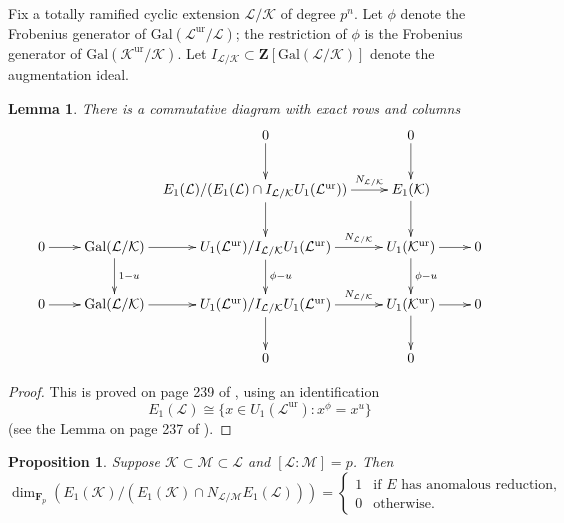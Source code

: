 \documentclass[reqno]{amsart}
\newtheorem{lem}[thm]{Lemma}
\newtheorem{prop}[thm]{Proposition}
\theoremstyle{definition}
\def\Z{\mathbf{Z}}
\def\F{\mathbf{F}}
\def\Fp{\F_p}
\def\K{\mathcal{K}}
\def\L{\mathcal{L}}
\def\M{\mathcal{M}}
\def\Gal{\mathrm{Gal}}
\def\unr{\mathrm{ur}}
\begin{document}
Fix a totally ramified cyclic extension $\L/\K$ of degree $p^n$.  
Let $\phi$ denote the Frobenius generator of $\Gal(\L^\unr/\L)$; the 
restriction of $\phi$ is the Frobenius generator of 
$\Gal(\K^\unr/\K)$.  
Let $I_{\L/\K} \subset \Z[\Gal(\L/\K)]$ denote the augmentation ideal.

\begin{lem}
\label{bigd}
There is a commutative diagram with exact rows and columns
$$
\xymatrix@C=22pt{
&& 0 \ar[d] & 0 \ar[d] \\
&& \hskip -15pt E_1(\L)/(E_1(\L) \cap I_{\L/\K} U_1(\L^\unr)) \ar^-{N_{\L/\K}}[r]\ar[d] & E_1(\K) \ar[d] \\
0 \ar[r] & \Gal(\L/\K) \ar[r] \ar^{1-u}[d] & U_1(\L^\unr)/I_{\L/\K} U_1(\L^\unr) 
    \ar^-{N_{\L/\K}}[r]\ar^{\phi-u}[d] & U_1(\K^\unr) \ar[r]\ar^{\phi-u}[d] & 0 \\
0 \ar[r] & \Gal(\L/\K) \ar[r] & U_1(\L^\unr)/I_{\L/\K} U_1(\L^\unr) 
    \ar^-{N_{\L/\K}}[r]\ar[d] & U_1(\K^\unr) \ar[r]\ar[d] & 0 \\
&& 0 & 0
}
$$
\end{lem}

\begin{proof}
This is proved on page 239 of \cite{luro}, using an identification 
$$
E_1(\L) \cong \{x \in U_1(\L^\unr) : x^\phi = x^u\}
$$
(see the Lemma on page 237 of \cite{luro}).
\end{proof}

\begin{prop}
\label{e1ind}
Suppose $\K \subset \M \subset \L$ and $[\L:\M] = p$.  Then
$$
\dim_{\Fp}(E_1(\K) / (E_1(\K) \cap N_{\L/\M}E_1(\L))) = 
\begin{cases}
1 & \text{if $E$ has anomalous reduction}, \\
0 & \text{otherwise}.
\end{cases}
$$
\end{prop}
\end{document}
